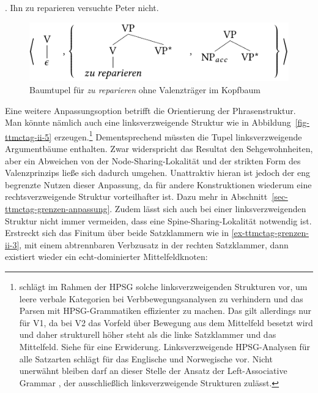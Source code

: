 \ex. Ihn zu reparieren versuchte Peter nicht. \label{ex-ttmctag-grenzen-ii-2}  

\begin{figure}[t]
\centering
\includegraphics{graphics/abb734.pdf}
\caption{\label{fig-ttmctag-grenzen-ii-4}Baumtupel für {\it zu reparieren} ohne Valenzträger im Kopfbaum}
\end{figure}

Eine weitere Anpassungsoption betrifft die Orientierung der Phrasenstruktur. Man könnte nämlich auch eine linksverzweigende Struktur wie in Abbildung~\ref{fig-ttmctag-ii-5} erzeugen.\footnote{\cite{Crysmann:03} schlägt im Rahmen der HPSG solche linksverzweigenden Strukturen vor, um leere verbale Kategorien bei Verbbewegungsanalysen zu verhindern und das Parsen mit HPSG-Grammatiken effizienter zu machen. Das gilt allerdings nur für V1, da bei V2 das Vorfeld über Bewegung aus dem Mittelfeld besetzt wird und daher strukturell höher steht als die linke Satzklammer und das Mittelfeld. Siehe \cite{Mueller:05} für eine Erwiderung. Linksverzweigende HPSG-Analysen für alle Satzarten schlägt \cite{Haugereid:09} für das Englische und Norwegische vor. Nicht unerwähnt bleiben darf an dieser Stelle der Ansatz der Left-Associative Grammar \citep{Hausser:89}, der ausschließlich linksverzweigende Strukturen zulässt.}
Dementsprechend müssten die Tupel linksverzweigende Argumentbäume enthalten. Zwar widerspricht das Resultat den Sehgewohnheiten, aber ein Abweichen von der Node-Sharing-Lokalität und der strikten Form des Valenzprinzips lie\ss e sich dadurch umgehen. Unattraktiv hieran ist jedoch der eng begrenzte Nutzen dieser Anpassung, da für andere Konstruktionen wiederum eine rechtsverzweigende Struktur vorteilhafter ist. Dazu mehr in Abschnitt~\ref{sec-ttmctag-grenzen-anpassung}. Zudem lässt sich auch bei einer linksverzweigenden Struktur nicht immer vermeiden, dass eine Spine-Sharing-Lokalität notwendig ist. Erstreckt sich das Finitum über beide Satzklammern wie in \ref{ex-ttmctag-grenzen-ii-3}, mit einem abtrennbaren Verbzusatz in der rechten Satzklammer, dann existiert wieder ein echt-dominierter Mittelfeldknoten:   

